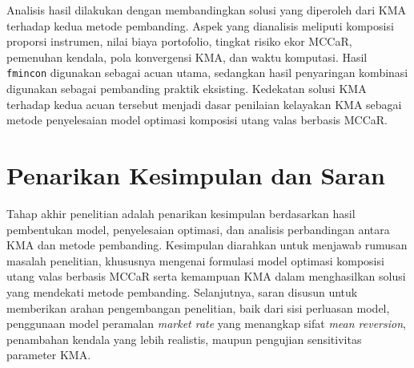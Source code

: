 Analisis hasil dilakukan dengan membandingkan solusi yang diperoleh dari KMA terhadap kedua metode pembanding. Aspek yang dianalisis meliputi komposisi proporsi instrumen, nilai biaya portofolio, tingkat risiko ekor MCCaR, pemenuhan kendala, pola konvergensi KMA, dan waktu komputasi. Hasil \texttt{fmincon} digunakan sebagai acuan utama, sedangkan hasil penyaringan kombinasi digunakan sebagai pembanding praktik eksisting. Kedekatan solusi KMA terhadap kedua acuan tersebut menjadi dasar penilaian kelayakan KMA sebagai metode penyelesaian model optimasi komposisi utang valas berbasis MCCaR.


\section{Penarikan Kesimpulan dan Saran}\label{sec:kesimpulan-saran} 
Tahap akhir penelitian adalah penarikan kesimpulan berdasarkan hasil pembentukan model, penyelesaian optimasi, dan analisis perbandingan antara KMA dan metode pembanding. Kesimpulan diarahkan untuk menjawab rumusan masalah penelitian, khususnya mengenai formulasi model optimasi komposisi utang valas berbasis MCCaR serta kemampuan KMA dalam menghasilkan solusi yang mendekati metode pembanding. Selanjutnya, saran disusun untuk memberikan arahan pengembangan penelitian, baik dari sisi perluasan model, penggunaan model peramalan \textit{market rate} yang menangkap sifat \textit{mean reversion}, penambahan kendala yang lebih realistis, maupun pengujian sensitivitas parameter KMA.